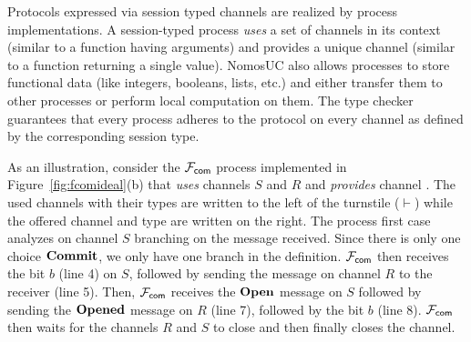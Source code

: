 

Protocols expressed via session typed channels are realized by process implementations.
A session-typed process \emph{uses} a set of channels in its context (similar to a function
having arguments) and provides a unique channel (similar to a function returning a single value).
NomosUC also allows processes to store functional data (like integers, booleans, lists, etc.)
and either transfer them to other processes or perform local computation on them.
The type checker guarantees that every process adheres to the protocol on every channel as defined by
the corresponding session type.


As an illustration, consider the $\mathcal{F}_{{\mathsf {com}}}$ process implemented in Figure~\ref{fig:fcomideal}(b)
that \emph{uses} channels $S$ and $R$ and \emph{provides} channel .
The used channels with their types are written to the left of the turnstile
($\vdash$) while the offered channel and type are written on the right.
The process first case analyzes on channel $S$ branching on the
message received.
Since there is only one choice $\mathbf{Commit}$, we only have one
branch in the definition.
$\mathcal{F}_{{\mathsf {com}}}$ then receives the bit $b$ (line 4) on $S$, followed by sending the
 message on channel $R$ to the receiver (line 5).
Then, $\mathcal{F}_{{\mathsf {com}}}$ receives the $\mathbf{Open}$ message on $S$ followed by sending the
$\mathbf{Opened}$ message on $R$ (line 7), followed by the bit $b$ (line 8).
$\mathcal{F}_{{\mathsf {com}}}$ then waits for the channels $R$ and $S$ to close and then finally
closes the  channel.



%

